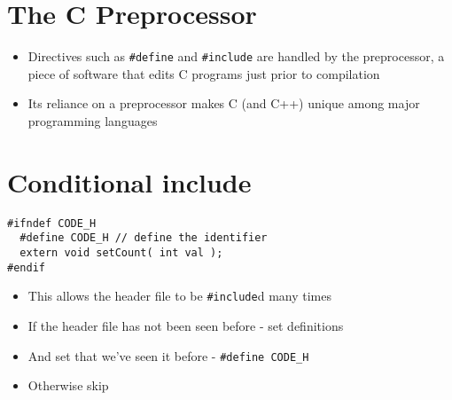 \documentclass{article}
\begin{document}
\section{The C Preprocessor}
\begin{center}
\end{center}
\begin{itemize}
\item Directives such as \verb!#define! and \verb!#include! are handled by the preprocessor, a piece of software that edits C programs just prior to compilation

\item Its reliance on a preprocessor makes C (and C++) unique among major programming languages
\end{itemize}



\section{Conditional include}
\begin{verbatim}
#ifndef CODE_H
  #define CODE_H // define the identifier
  extern void setCount( int val );
#endif
\end{verbatim}

\begin{itemize}
\item This allows the header file to be \verb!#include!d many times
\item If the header file has not been seen before - set definitions
\item And set that we've seen it before - \verb!#define CODE_H!
\item Otherwise skip
\end{itemize}
\end{document}
